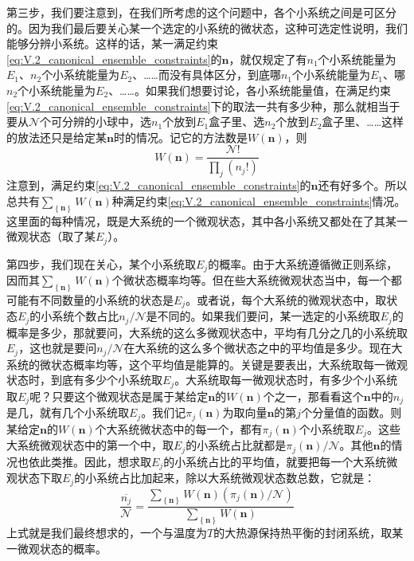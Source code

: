 \documentclass[main.tex]{subfiles}
\begin{document}
第三步，我们要注意到，在我们所考虑的这个问题中，各个小系统之间是可区分的。因为我们最后要关心某一个选定的小系统的微状态，这种可选定性说明，我们能够分辨小系统。这样的话，某一满足约束\eqref{eq:V.2_canonical_ensemble_constraints}的$\mathbf{n}$，就仅规定了有$n_1$个小系统能量为$E_1$、$n_2$个小系统能量为$E_2$、……而没有具体区分，到底哪$n_1$个小系统能量为$E_1$、哪$n_2$个小系统能量为$E_2$、……。如果我们想要讨论，各小系统能量值，在满足约束\eqref{eq:V.2_canonical_ensemble_constraints}下的取法一共有多少种，那么就相当于要从$\mathcal{N}$个可分辨的小球中，选$n_1$个放到$E_1$盒子里、选$n_2$个放到$E_2$盒子里、……这样的放法还只是给定某$\mathbf{n}$时的情况。记它的方法数是$W\left(\mathbf{n}\right)$，则
\[W\left(\mathbf{n}\right)=\frac{\mathcal{N}!}{\prod_j\left(n_j!\right)}\]
注意到，满足约束\eqref{eq:V.2_canonical_ensemble_constraints}的$\mathbf{n}$还有好多个。所以总共有$\sum_{\left\{\mathbf{n}\right\}}W\left(\mathbf{n}\right)$种满足约束\eqref{eq:V.2_canonical_ensemble_constraints}情况。这里面的每种情况，既是大系统的一个微观状态，其中各小系统又都处在了其某一微观状态（取了某$E_j$）。

第四步，我们现在关心，某个小系统取$E_j$的概率。由于大系统遵循微正则系综，因而其$\sum_{\left\{\mathbf{n}\right\}}W\left(\mathbf{n}\right)$个微状态概率均等。但在些大系统微观状态当中，每一个都可能有不同数量的小系统的状态是$E_j$。或者说，每个大系统的微观状态中，取状态$E_j$的小系统个数占比$n_j/\mathcal{N}$是不同的。如果我们要问，某一选定的小系统取$E_j$的概率是多少，那就要问，大系统的这么多微观状态中，平均有几分之几的小系统取$E_j$，这也就是要问$n_j/\mathcal{N}$在大系统的这么多个微状态之中的平均值是多少。现在大系统的微状态概率均等，这个平均值是能算的。关键是要表出，大系统取每一微观状态时，到底有多少个小系统取$E_j$。大系统取每一微观状态时，有多少个小系统取$E_j$呢？只要这个微观状态是属于某给定$\mathbf{n}$的$W\left(\mathbf{n}\right)$个之一，那看看这个$\mathbf{n}$中的$n_j$是几，就有几个小系统取$E_j$。我们记$\pi_j\left(\mathbf{n}\right)$为取向量$\mathbf{n}$的第$j$个分量值的函数。则某给定$\mathbf{n}$的$W\left(\mathbf{n}\right)$个大系统微状态中的每一个，都有$\pi_j\left(\mathbf{n}\right)$个小系统取$E_j$。这些大系统微观状态中的第一个中，取$E_j$的小系统占比就都是$\pi_j\left(\mathbf{n}\right)/\mathcal{N}$。其他$\mathbf{n}$的情况也依此类推。因此，想求取$E_j$的小系统占比的平均值，就要把每一个大系统微观状态下取$E_j$的小系统占比加起来，除以大系统微观状态数总数，它就是：
\[\overline{\frac{n_j}{\mathcal{N}}}=\frac{\sum_{\left\{\mathbf{n}\right\}}W\left(\mathbf{n}\right)\left(\pi_j\left(\mathbf{n}\right)/\mathcal{N}\right)}{\sum_{\left\{\mathbf{n}\right\}}W\left(\mathbf{n}\right)}\]
上式就是我们最终想求的，一个与温度为$T$的大热源保持热平衡的封闭系统，取某一微观状态的概率。
\end{document}
